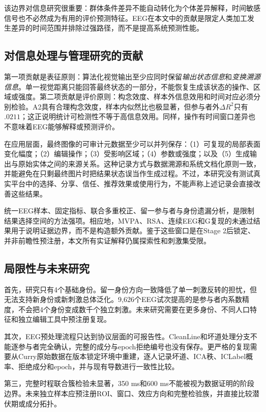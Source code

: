\documentclass[preprint,12pt,authoryear]{elsarticle}
\begin{document}
该边界对信息研究很重要：群体条件差异不能自动转化为个体差异解释，时间敏感信号也不必然成为有用的评价预测特征。EEG在本文中的贡献是限定人类加工发生差异的时间范围并排除过强路径，而不是提高系统预测性能。

\subsection{对信息处理与管理研究的贡献}

第一项贡献是表征原则：算法化视觉输出至少应同时保留\emph{输出状态信息}和\emph{变换溯源信息}。单一视觉距离只能回答最终状态的一部分，不能恢复生成该状态的操作、区域或强度。第二项贡献是评价原则：构念效度、样本外信息效用和时间对应必须分别检验。A2具有合理构念效度，样本内似然比也极显著，但参与者外$\Delta R^2$只有$.0211$；这正说明统计可检测性不等于高信息效用\citep{Shmueli2010,WangStrong1996}。同样，操作有时间窗口差异也不意味着EEG能够解释或预测评价。

在应用层面，最终图像的可审计元数据至少可以并列保存：（1）可复现的局部表面变化幅度；（2）编辑操作；（3）受影响区域；（4）参数或强度；以及（5）生成输出与原始实体之间的来源关系。这种记录方式与数据溯源和系统文档化原则一致\citep{MoreauMissier2013,Mitchell2019,Gebru2021}，并能避免在只剩最终图片时把结果状态误当作生成过程。不过，本研究没有测试真实平台中的选择、分享、信任、推荐效果或使用行为，不能声称上述记录会直接改善这些结果。

统一EEG样本、固定指标、联合多重校正、留一参与者与身份遗漏分析，是限制结果选择空间的方法强项。相应地，MVPA、RSA、连续EEG和G复现的未通过结果用于说明证据边界，而不是构造额外贡献。鉴于这些窗口是在Stage 2后锁定、并非前瞻性预注册，本文所有实证解释仍属探索性和刺激集受限。

\subsection{局限性与未来研究}

首先，研究只有4个基础身份。留一身份方向一致降低了单一刺激反转的担忧，但无法支持新身份或新刺激总体泛化。9,626个EEG试次提高的是参与者内系数精度，不会把4个身份变成数千个独立刺激。未来研究需要在更多身份、不同人口特征和独立编辑工具中预注册复现。

其次，EEG预处理流程只达到协议层面的可报告性。CleanLine和坏道处理分支不能逐参与者完全确认，完整的成分与epoch拒绝编号也没有保存。更严格的复现需要从Curry原始数据在版本锁定环境中重建，逐人记录坏道、ICA秩、ICLabel概率、拒绝成分和epoch，并与现有导数进行一致性比较。

第三，完整时程联合簇检验未显著，350 ms和600 ms不能被视为数据证明的阶段边界。未来独立样本应预注册ROI、窗口、效应方向和完整检验族，并直接比较潜伏期或成分拓扑。
\end{document}
